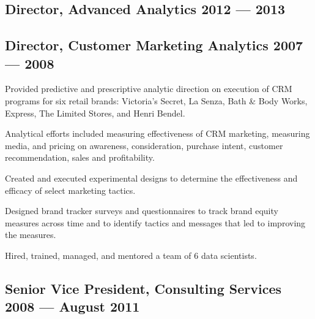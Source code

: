 \subsection{{Director, Advanced Analytics \hfill 2012 --- 2013}}
\subsection{{Director, Customer Marketing Analytics \hfill 2007 --- 2008}}
\begin{zitemize}
\item Provided predictive and prescriptive analytic direction on execution of CRM programs for six retail brands:   Victoria's Secret, La Senza, Bath \& Body Works, Express, The Limited Stores, and Henri Bendel.
\vspace{0.2em}
\item Analytical efforts included measuring effectiveness of CRM marketing, measuring media, and pricing on awareness, consideration, purchase intent, customer recommendation, sales and profitability.  %
\vspace{0.2em}
\item Created and executed experimental designs to determine the effectiveness and efficacy of select marketing tactics.
\vspace{0.2em}
\item Designed brand tracker surveys and questionnaires to track brand equity measures across time and to identify tactics and messages that led to improving the measures.  
\vspace{0.2em}
\item Hired, trained, managed, and mentored a team of 6 data scientists.
\end{zitemize}

\subsection{{Senior Vice President, Consulting Services \hfill 2008 --- August 2011}}
